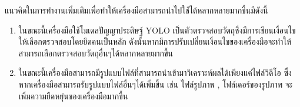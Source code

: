 แนวคิดในการทำงานเพิ่มเติมเพื่อทำให้เครื่องมือสามารถนำไปใช้ได้หลากหลายมากขึ้นมีดังนี้
\begin{enumerate}
	\item ในขณะนี้เครื่องมือใช้โมเดลปัญญาประดิษฐ์ YOLO เป็นตัวตรวจสอบวัตถุซึ่งมีการเขียนเงื่อนไขให้เลือกตรวจสอบโดยยึดคนเป็นหลัก  ดังนั้นหากมีการปรับเปลี่ยนเงื่อนไขของเครื่องมือจะทำให้สามารถเลือกตรวจสอบวัตถุอื่นๆได้หลากหลายมากขึ้น
	\item ในขณะนี้เครื่องมือสามารถมีรูปแบบไฟล์ที่สามารถนำเข้ามาวิเคราะห์ผลได้เพียงแค่ไฟล์วิดีโอ ซึ่งหากเครื่องมือสามารถรับรูปแบบไฟล์อื่นๆได้เพิ่มขึ้น เช่น ไฟล์รูปภาพ , โฟล์เดอร์ของรูปภาพ จะเพิ่มความยืดหยุ่นของเครื่องมือมากขึ้น
\end{enumerate}